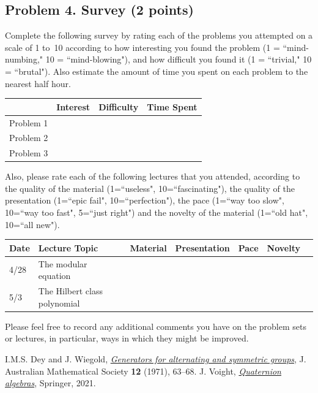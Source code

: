 \documentclass[11pt]{article}
\theoremstyle{definition}
\begin{document}
\subsection*{Problem 4. Survey (2 points)}

Complete the following survey by rating each of the problems you attempted on a scale of 1 to~10 according to how interesting you found the problem (1 = ``mind-numbing," 10 = ``mind-blowing"), and how difficult you found it (1 = ``trivial," 10 = ``brutal").  Also estimate the amount of time you spent on each problem to the nearest half hour.

\begin{center}
\begin{tabular}{l|r|r|r|}
& Interest & Difficulty & Time Spent\\\hline
Problem 1 & & & \\\hline
Problem 2 & & & \\\hline
Problem 3 & & & \\\hline
\end{tabular}
\end{center}
\noindent
Also, please rate each of the following lectures that you attended, according to the quality of the material (1=``useless", 10=``fascinating"), the quality of the presentation (1=``epic fail", 10=``perfection"), the pace (1=``way too slow", 10=``way too fast", 5=``just right") and the novelty of the material (1=``old hat", 10=``all new").

\begin{center}
\begin{tabular}{l|l|r|r|r|r|r}
Date & Lecture Topic & Material & Presentation & Pace & Novelty\\\hline
4/28 & The modular equation & & & & \\\hline 
5/3 & The Hilbert class polynomial & & & & \\\hline 
\end{tabular}
\end{center}

\noindent
Please feel free to record any additional comments you have on the problem sets or lectures, in particular, ways in which they might be improved.

\begin{thebibliography}{}
I.M.S. Dey and J. Wiegold, \href{https://doi.org/10.1017/S1446788700008302}{\textit{Generators for alternating and symmetric groups}}, J. Australian Mathematical Society \textbf{12} (1971), 63--68.
J. Voight, \href{https://math.dartmouth.edu/~jvoight/quat-book.pdf}{\textit{Quaternion algebras}}, Springer, 2021.
\end{thebibliography}
\end{document}
